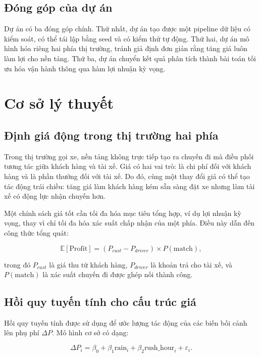 \documentclass[12pt,a4paper]{report}
\begin{document}
\section{Đóng góp của dự án}

Dự án có ba đóng góp chính. Thứ nhất, dự án tạo được một pipeline dữ liệu có kiểm soát, có thể tái lập bằng seed và có kiểm thử tự động. Thứ hai, dự án mô hình hóa riêng hai phía thị trường, tránh giả định đơn giản rằng tăng giá luôn làm lợi cho nền tảng. Thứ ba, dự án chuyển kết quả phân tích thành bài toán tối ưu hóa vận hành thông qua hàm lợi nhuận kỳ vọng.

\chapter{Cơ sở lý thuyết}

\section{Định giá động trong thị trường hai phía}

Trong thị trường gọi xe, nền tảng không trực tiếp tạo ra chuyến đi mà điều phối tương tác giữa khách hàng và tài xế. Giá có hai vai trò: là chi phí đối với khách hàng và là phần thưởng đối với tài xế. Do đó, cùng một thay đổi giá có thể tạo tác động trái chiều: tăng giá làm khách hàng kém sẵn sàng đặt xe nhưng làm tài xế có động lực nhận chuyến hơn.

Một chính sách giá tốt cần tối đa hóa mục tiêu tổng hợp, ví dụ lợi nhuận kỳ vọng, thay vì chỉ tối đa hóa xác suất chấp nhận của một phía. Điều này dẫn đến công thức tổng quát:

\begin{equation}
    \mathbb{E}[\text{Profit}] = (P_{cust} - P_{driver}) \times P(\text{match}),
\end{equation}

trong đó $P_{cust}$ là giá thu từ khách hàng, $P_{driver}$ là khoản trả cho tài xế, và $P(\text{match})$ là xác suất chuyến đi được ghép nối thành công.

\section{Hồi quy tuyến tính cho cấu trúc giá}

Hồi quy tuyến tính được sử dụng để ước lượng tác động của các biến bối cảnh lên phụ phí $\Delta P$. Mô hình cơ sở có dạng:

\begin{equation}
    \Delta P_i = \beta_0 + \beta_1 \text{rain}_i + \beta_2 \text{rush\_hour}_i + \varepsilon_i.
\end{equation}
\end{document}
